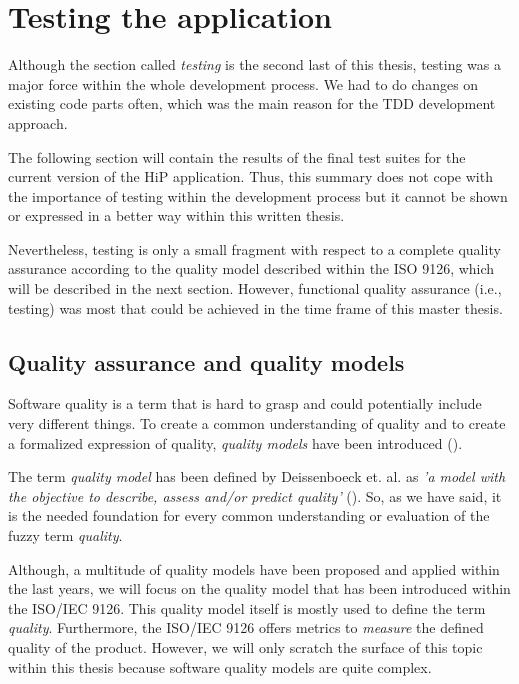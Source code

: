 \chapter[Testing the application]{Testing the application}
Although the section called \textit{testing} is the second last of this thesis, testing was a major force within the whole development process. We had to do changes on existing code parts often, which was the main reason for the \ac{TDD} development approach. 

The following section will contain the results of the final test suites for the current version of the HiP application. Thus, this summary does not cope with the importance of testing within the development process but it cannot be shown or expressed in a better way within this written thesis. 

Nevertheless, testing is only a small fragment with respect to a complete quality assurance according to the quality model described within the ISO 9126, which will be described in the next section. However, functional quality assurance (i.e., testing) was most that could be achieved in the time frame of this master thesis. 

\section{Quality assurance and quality models}
Software quality is a term that is hard to grasp and could potentially include very different things. To create a common understanding of quality and to create a formalized expression of quality, \emph{quality models} have been introduced (\cite{waghmodesoftware}). 

The term \emph{quality model} has been defined by Deissenboeck et. al. as \emph{'a model with the objective to describe, assess and/or predict quality'}  (\cite{deissenboeck2009software}). So, as we have said, it is the needed foundation for every common understanding or evaluation of the fuzzy term \emph{quality}.

Although, a multitude of quality models have been proposed and applied within the last years, we will focus on the quality model that has been introduced within the ISO/IEC 9126. This quality model itself is mostly used to define the term \emph{quality}. Furthermore, the ISO/IEC 9126 offers metrics to \emph{measure} the defined quality of the product. However, we will only scratch the surface of this topic within this thesis because software quality models are quite complex.

